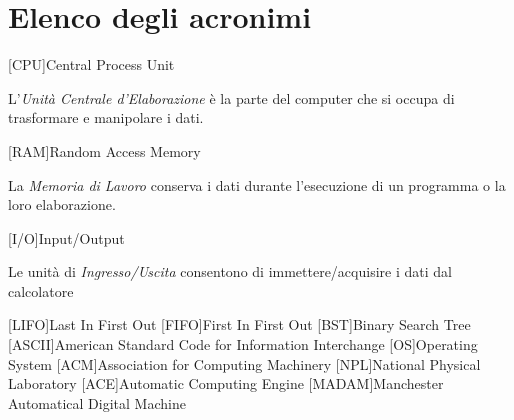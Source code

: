\chapter{Elenco degli acronimi}
\begin{acronym}[MADAM]
	[CPU]{\foreignlanguage{english}Central Process Unit}
{\small\par\noindent L'\emph{Unità Centrale d'Elaborazione} è la parte del computer che si occupa di trasformare e manipolare i dati.}
	[RAM]{\foreignlanguage{english}Random Access Memory}
{\small\par\noindent La \emph{Memoria di Lavoro} conserva i dati durante l'esecuzione di un programma o la loro elaborazione.}
	[I/O]{\foreignlanguage{english}Input/Output}
{\small\par\noindent Le unità di \emph{Ingresso/Uscita} consentono di immettere/acquisire i dati dal calcolatore}
	[LIFO]{\foreignlanguage{english}Last In First Out}
	[FIFO]{\foreignlanguage{english}First In First Out}
	[BST]{\foreignlanguage{english}Binary Search Tree}
	[ASCII]{\foreignlanguage{english}American Standard Code for Information Interchange}
	[OS]{\foreignlanguage{english}Operating System}
	[ACM]{\foreignlanguage{english}Association for Computing Machinery}
	[NPL]{\foreignlanguage{english}National Physical Laboratory}
	[ACE]{\foreignlanguage{english}Automatic Computing Engine}
	[MADAM]{\foreignlanguage{english}Manchester Automatical Digital Machine}
\end{acronym}